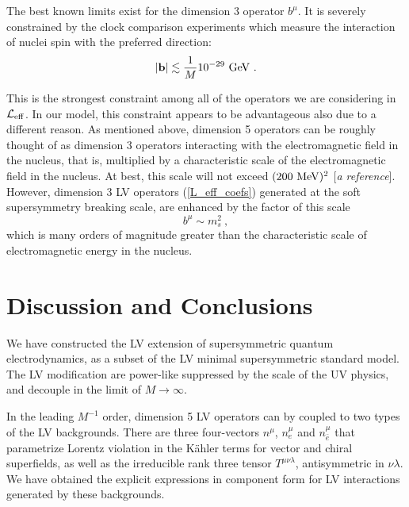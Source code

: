 \documentclass[12pt]{revtex4}
\begin{document}
The best known limits exist for the dimension 3 operator
$ b^\mu $.
It is severely constrained by the clock comparison experiments which
measure the interaction of nuclei spin with the preferred
direction:
\begin{equation}
| {\mathbf b} | \lesssim \frac{1}{M} 10^{-29}~{\rm GeV}
        ~.
\end{equation}

This is the strongest constraint among all of the operators
we are considering in $ \mathcal{L}_{\rm eff} $.
In our model, this constraint appears to be advantageous
also due to a different reason.
As mentioned above, dimension 5 operators can be roughly
thought of as dimension 3 operators interacting with the
electromagnetic field in the nucleus, that is,
multiplied by a characteristic scale of the electromagnetic
field in the nucleus.
At best, this scale will not exceed $ (200\ {\rm MeV})^2 $
[{\it a reference}].
However, dimension 3 LV operators (\ref{L_eff_coefs}) 
generated at the soft
supersymmetry breaking scale, are enhanced by the factor
of this scale
\[
b^\mu \sim m_s^2~,
\]
which is many orders of magnitude greater than the characteristic
scale of electromagnetic energy in the nucleus.






\section{Discussion and Conclusions}

We have constructed the LV extension of supersymmetric quantum electrodynamics,
as a subset of the LV minimal supersymmetric standard model.
The LV modification are power-like suppressed by the scale of the UV physics,
and decouple in the limit of $M\to \infty$. 

In the leading $M^{-1}$ order, dimension 5 LV operators can by coupled to
two types of the LV backgrounds. There are three four-vectors $n^\mu$, $n^\mu_e$ and $n^{\mu}_{\bar e}$
that parametrize Lorentz violation in the K\"ahler terms for vector and chiral superfields, 
as well as the irreducible rank three tensor $T^{\mu\nu\lambda}$, antisymmetric in $\nu\lambda$. 
We have obtained the explicit expressions in component form for LV interactions generated by these 
backgrounds. 
\end{document}
